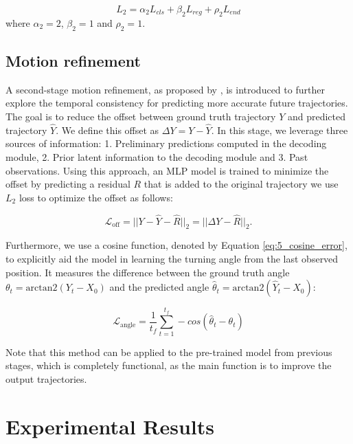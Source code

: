 \begin{equation}
	L_{2} = \alpha_2 L_{cls} + \beta_2 L_{reg} + \rho_2 L_{end}
\end{equation}
where $\alpha_2=2$, $\beta_2=1$ and $\rho_2=1$.

\subsection{Motion refinement}
\label{subsec:refinement}

A second-stage motion refinement, as proposed by \cite{liu2023laformer}, is introduced to further explore the temporal consistency for predicting more accurate future trajectories. The goal is to reduce the offset between ground truth trajectory $Y$ and predicted trajectory $\hat{Y}$. We define this offset as $\Delta{Y} = Y - \hat{Y}$. In this stage, we leverage three sources of information: 1. Preliminary predictions computed in the decoding module, 2. Prior latent information to the decoding module and 3. Past observations. Using this approach, an MLP model is trained to minimize the offset by predicting a residual $R$ that is added to the original trajectory \ie we use $L_2$ loss to optimize the offset as follows:

\begin{equation}
	\label{eq:5_pose_error}
	\mathcal{L}_\text{off}= ||{Y} - \hat{Y} - \hat{R}||_2 = ||\Delta{Y} - \hat{R}||_2.
\end{equation}

Furthermore, we use a cosine function, denoted by Equation \ref{eq:5_cosine_error}, to explicitly aid the model in learning the turning angle from the last observed position. It measures the difference between the ground truth angle $\theta_{t}= \text{arctan2}(Y_{t}-{X}_{0})$ and the predicted angle $\hat{\theta}_{t}= \text{arctan2}(\hat{Y}_{t}-{X}_{0})$:

\begin{equation}
	\mathcal{L}_{\text{angle}}=\frac{1}{t_{f}}\sum^{t_{f}}_{t=1}-cos(\hat{\theta}_{t}-\theta_{t})
	\label{eq:5_cosine_error}
\end{equation}

Note that this method can be applied to the pre-trained model from previous stages, which is completely functional, as the main function is to improve the output trajectories.

\section{Experimental Results}
\label{sec:7_experimental_results}

